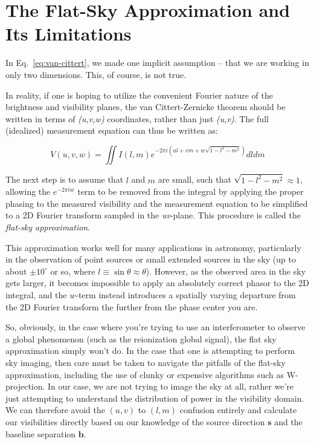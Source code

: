 \chapter{The Flat-Sky Approximation and Its Limitations}
\label{appendix}

In Eq.~\eqref{eq:van-cittert}, we made one implicit assumption -- that we are 
working in only two dimensions. This, of course, is not true. 

In reality, if one is hoping to utilize the convenient Fourier nature of the 
brightness and visibility planes, the van Cittert-Zernicke theorem should be 
written in terms of \emph{(u,v,w)} coordinates, rather than just \emph{(u,v)}.  
The full (idealized) measurement equation can thus be written as:

\begin{equation}
    V(u,v,w) = \iint I(l,m) e^{-2\pi i (ul + vm + w\sqrt{1 - l^2 - m^2})} dl dm
    \label{eq:full-measurement}
\end{equation}

The next step is to assume that $l$ and $m$ are small, such that $\sqrt{1 - l^2 
- m^2} \approx 1$, allowing the $e^{-2\pi i w}$ term to be removed from the 
integral by applying the proper phasing to the measured visibility and the 
measurement equation to be simplified to a 2D Fourier transform sampled in the 
\emph{uv}-plane. This procedure is called the \emph{flat-sky approximation}.

This approximation works well for many applications in astronomy, particularly 
in the observation of point sources or small extended sources in the sky (up to 
about $\pm10^\circ$ or so, where $l \equiv \sin\theta \approx \theta$).  
However, as the observed area in the sky gets larger, it becomes impossible to 
apply an absolutely correct phasor to the 2D integral, and the $w$-term instead 
introduces a spatially varying departure from the 2D Fourier transform the 
further from the phase center you are.

So, obviously, in the case where you're trying to use an interferometer to 
observe a global phenomenon (such as the reionization global signal), the flat 
sky approximation simply won't do. In the case that one is attempting to 
perform sky imaging, then care must be taken to navigate the pitfalls of the 
flat-sky approximation, including the use of clunky or expensive algorithms 
such as W-projection. In our case, we are not trying to image the sky at all, 
rather we're just attempting to understand the distribution of power in the 
visibility domain. We can therefore avoid the $(u,v)$ to $(l,m)$ confusion 
entirely and calculate our visibilities directly based on our knowledge of the 
source direction $\mathbf{s}$ and the baseline separation $\mathbf{b}$.
